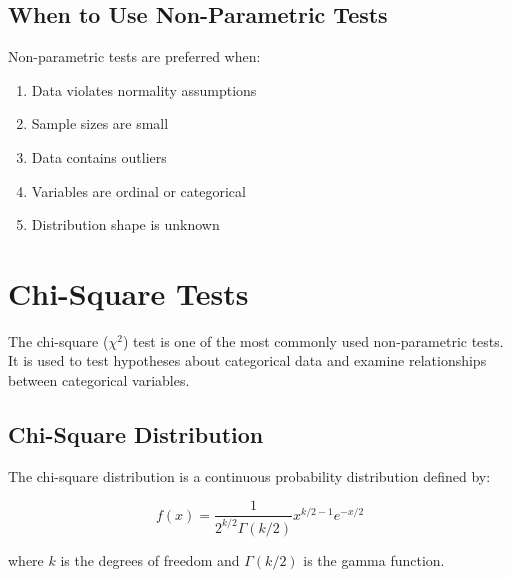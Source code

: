 \documentclass[twoside]{book}
\begin{document}
\subsection{When to Use Non-Parametric Tests}

Non-parametric tests are preferred when:
\begin{enumerate}
    \item Data violates normality assumptions
    \item Sample sizes are small
    \item Data contains outliers
    \item Variables are ordinal or categorical
    \item Distribution shape is unknown
\end{enumerate}

\section{Chi-Square Tests}

The chi-square ($\chi^2$) test is one of the most commonly used non-parametric tests. It is used to test hypotheses about categorical data and examine relationships between categorical variables.

\subsection{Chi-Square Distribution}

The chi-square distribution is a continuous probability distribution defined by:

\begin{equation}
f(x) = \frac{1}{2^{k/2}\Gamma(k/2)} x^{k/2-1} e^{-x/2}
\end{equation}

where $k$ is the degrees of freedom and $\Gamma(k/2)$ is the gamma function.

\begin{center}
\end{center}
\end{document}
